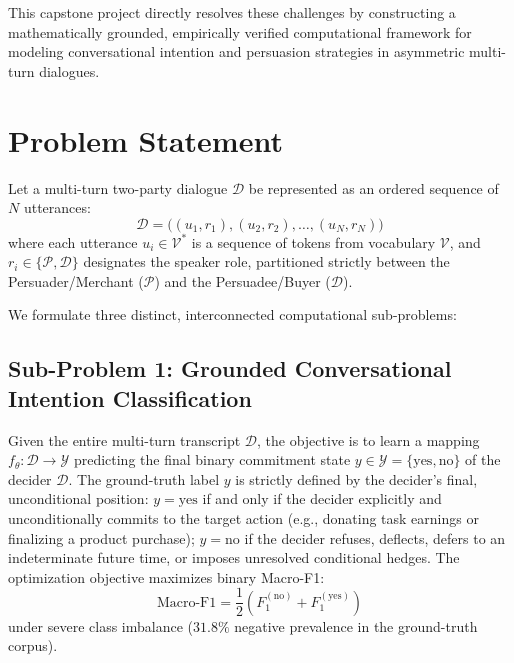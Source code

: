 This capstone project directly resolves these challenges by constructing a mathematically grounded, empirically verified computational framework for modeling conversational intention and persuasion strategies in asymmetric multi-turn dialogues.

\section{Problem Statement}
\label{sec:problem-statement}

\begin{summarybox}
Let a multi-turn two-party dialogue $\mathcal{D}$ be represented as an ordered sequence of $N$ utterances:
\begin{equation}
  \mathcal{D} = \big( (u_1, r_1), (u_2, r_2), \dots, (u_N, r_N) \big)
\end{equation}
where each utterance $u_i \in \mathcal{V}^*$ is a sequence of tokens from vocabulary $\mathcal{V}$, and $r_i \in \{\mathcal{P}, \mathcal{D}\}$ designates the speaker role, partitioned strictly between the Persuader/Merchant ($\mathcal{P}$) and the Persuadee/Buyer ($\mathcal{D}$).
\end{summarybox}

We formulate three distinct, interconnected computational sub-problems:

\subsection{Sub-Problem 1: Grounded Conversational Intention Classification}
Given the entire multi-turn transcript $\mathcal{D}$, the objective is to learn a mapping $f_\theta: \mathcal{D} \to \mathcal{Y}$ predicting the final binary commitment state $y \in \mathcal{Y} = \{\text{yes}, \text{no}\}$ of the decider $\mathcal{D}$. The ground-truth label $y$ is strictly defined by the decider's final, unconditional position: $y = \text{yes}$ if and only if the decider explicitly and unconditionally commits to the target action (e.g., donating task earnings or finalizing a product purchase); $y = \text{no}$ if the decider refuses, deflects, defers to an indeterminate future time, or imposes unresolved conditional hedges. The optimization objective maximizes binary Macro-F1:
\begin{equation}
  \text{Macro-F1} = \frac{1}{2} \left( F_1^{(\text{no})} + F_1^{(\text{yes})} \right)
\end{equation}
under severe class imbalance ($31.8\%$ negative prevalence in the ground-truth corpus).

